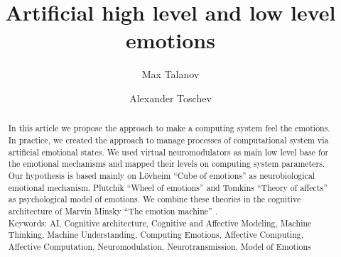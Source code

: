 \documentclass[oribibl]{llncs}
\begin{document}
\title{Artificial high level and low level emotions}
\author{Max Talanov \and Alexander Toschev}
\maketitle
\begin{abstract}
In this article we propose the approach to make a computing system feel the emotions. In practice, we created the approach to manage processes of computational system via artificial emotional states. We used virtual neuromodulators as main low level base for the emotional mechanisms and mapped their levels on computing system parameters. Our hypothesis is based mainly on L\"{o}vheim ``Cube of emotions'' \cite{cubeofemotions} as neurobiological emotional mechanism, Plutchik ``Wheel of emotions'' \cite{natureofemotions} and Tomkins ``Theory of affects'' \cite{primer_affect_psychology} as psychological model of emotions. We combine these theories in the cognitive architecture of Marvin Minsky ``The emotion machine'' \cite{emotionmachine}.\\
Keywords: AI, Cognitive architecture, Cognitive and Affective Modeling, Machine Thinking, Machine Understanding, Computing Emotions, Affective Computing, Affective Computation, Neuromodulation, Neurotransmission, Model of Emotions
\end{abstract}



\end{document}
